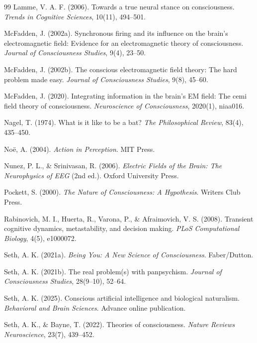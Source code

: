 \documentclass[11pt]{article}
\begin{document}
\begin{thebibliography}{99}
 Lamme, V. A. F. (2006). Towards a true neural stance on consciousness. \textit{Trends in Cognitive Sciences}, 10(11), 494--501.

 McFadden, J. (2002a). Synchronous firing and its influence on the brain's electromagnetic field: Evidence for an electromagnetic theory of consciousness. \textit{Journal of Consciousness Studies}, 9(4), 23--50.

 McFadden, J. (2002b). The conscious electromagnetic field theory: The hard problem made easy. \textit{Journal of Consciousness Studies}, 9(8), 45--60.

 McFadden, J. (2020). Integrating information in the brain's EM field: The cemi field theory of consciousness. \textit{Neuroscience of Consciousness}, 2020(1), niaa016.

 Nagel, T. (1974). What is it like to be a bat? \textit{The Philosophical Review}, 83(4), 435--450.

 No\"e, A. (2004). \textit{Action in Perception}. MIT Press.

 Nunez, P. L., \& Srinivasan, R. (2006). \textit{Electric Fields of the Brain: The Neurophysics of EEG} (2nd ed.). Oxford University Press.

 Pockett, S. (2000). \textit{The Nature of Consciousness: A Hypothesis}. Writers Club Press.

 Rabinovich, M. I., Huerta, R., Varona, P., \& Afraimovich, V. S. (2008). Transient cognitive dynamics, metastability, and decision making. \textit{PLoS Computational Biology}, 4(5), e1000072.

 Seth, A. K. (2021a). \textit{Being You: A New Science of Consciousness}. Faber/Dutton.

 Seth, A. K. (2021b). The real problem(s) with panpsychism. \textit{Journal of Consciousness Studies}, 28(9--10), 52--64.

 Seth, A. K. (2025). Conscious artificial intelligence and biological naturalism. \textit{Behavioral and Brain Sciences}. Advance online publication.

 Seth, A. K., \& Bayne, T. (2022). Theories of consciousness. \textit{Nature Reviews Neuroscience}, 23(7), 439--452.


\end{thebibliography}
\end{document}
